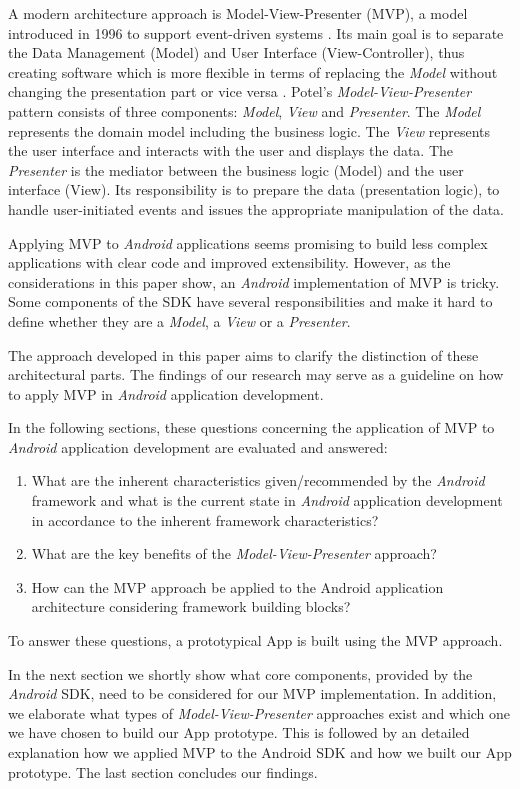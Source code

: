 
A modern architecture approach is Model-View-Presenter (MVP), a model introduced in 1996 to support event-driven systems \cite{TaligentMVP}. Its main goal is to separate the Data Management (Model) and User Interface (View-Controller), thus creating software which is more flexible in terms of replacing the \emph{Model} without changing the presentation part or vice versa \cite{PassiveMVC}.
Potel's \emph{Model-View-Presenter} pattern consists of three components: \emph{Model}, \emph{View} and \emph{Presenter}. The \emph{Model} represents the domain model including the business logic. The \emph{View} represents the user interface and interacts with the user and displays the data. The \emph{Presenter} is the mediator between the business logic (Model) and the user interface (View). Its responsibility is to prepare the data (presentation logic), to handle user-initiated events and issues the appropriate manipulation of the data.


Applying MVP to \emph{Android} applications seems promising to build less complex applications with clear code and improved extensibility. However, as the considerations in this paper show, an \emph{Android} implementation of MVP is tricky. Some components of the SDK have several responsibilities and make it hard to define whether they are a \emph{Model}, a \emph{View} or a \emph{Presenter}. 

The approach developed in this paper aims to clarify the distinction of these architectural parts. The findings of our research may serve as a guideline on how to apply MVP in \emph{Android} application development.


In the following sections, these questions concerning the application of MVP to \emph{Android} application development are evaluated and answered:

\begin{enumerate}[label={RQ\arabic*:}, leftmargin=0.95cm]
\item What are the inherent characteristics given/recommended by the \emph{Android} framework and what is the current state in \emph{Android} application development in accordance to the inherent framework characteristics?
\item What are the key benefits of the \emph{Model-View-Presenter} approach?
\item How can the MVP approach be applied to the Android application architecture considering framework building blocks?
\end{enumerate}

To answer these questions, a prototypical App is built using the MVP approach. 

In the next section we shortly show what core components, provided by the \emph{Android} SDK, need to be considered for our MVP implementation. In addition, we elaborate what types of \emph{Model-View-Presenter} approaches exist and which one we have chosen to build our App prototype. This is followed by an detailed explanation how we applied MVP to the Android SDK and how we built our App prototype. The last section concludes our findings.
